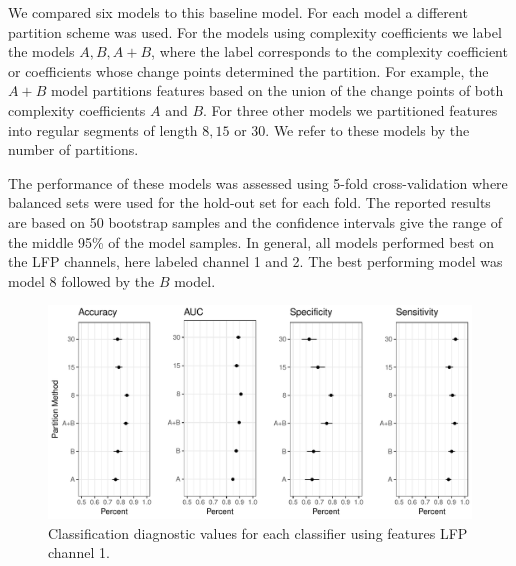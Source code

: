 
We compared six models to this baseline model. For each 
model a different partition scheme was used. For the models
using complexity coefficients we label the models $A, B, A+B$,
 where the label corresponds to the complexity coefficient 
 or coefficients whose change points determined the
 partition. For example, the $A + B$ model partitions
 features based on the union 
of the change points of both complexity coefficients $A$ and 
$B$. 
For three other models we partitioned features into regular 
segments of length $8, 15$ or $30$. We refer to these models
by the number of partitions.

The performance of these models was assessed using 
5-fold cross-validation where balanced sets were used for the hold-out set for each fold. The reported results are based on 50 bootstrap samples and the confidence intervals give the range 
of the middle 95\% of the model samples.
In general, all models performed best on the LFP channels, 
here labeled channel 1 and 2. The best performing model was model $8$ followed by the $B$ model.

\begin{figure}[!htbp]
  \begin{center}
  \includegraphics[width = \textwidth, keepaspectratio]{./figs/eeg-partition-diagnostic.pdf}
  \end{center}
  \caption{Classification diagnostic values for each classifier using
   features LFP channel 1.}
  \label{fig:eeg-diagnostic} 
\end{figure}

